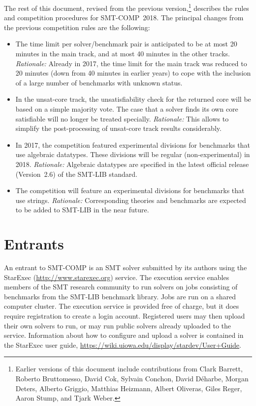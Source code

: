 \documentclass[12pt]{article}
\begin{document}
The rest of this document, revised from the previous
version,\footnote{Earlier versions of this document include
  contributions from Clark Barrett, Roberto Bruttomesso, David Cok,
  Sylvain Conchon, David D{\'e}harbe, Morgan Deters, Alberto Griggio,
  Matthias Heizmann, Albert Oliveras, Giles Reger, Aaron Stump, and
  Tjark Weber.}  describes the rules and competition procedures for
SMT-COMP~2018.  The principal changes from the previous competition
rules are the following:
\begin{itemize}
\item The time limit per solver/benchmark pair is anticipated to be at
  most 20 minutes in the main track, and at most 40 minutes in the
  other tracks.  \emph{Rationale:} Already in 2017, the time limit for
  the main track was reduced to 20 minutes (down from 40 minutes in
  earlier years) to cope with the inclusion of a large number of
  benchmarks with unknown status.

\item In the unsat-core track, the unsatisfiability check for the
  returned core will be based on a simple majority vote.  The case
  that a solver finds its own core satisfiable will no longer be
  treated specially.  \emph{Rationale:} This allows to simplify the
  post-processing of unsat-core track results considerably.

\item In 2017, the competition featured experimental divisions for
  benchmarks that use algebraic datatypes.  These divisions will be
  regular (non-experimental) in 2018. \emph{Rationale:} Algebraic
  datatypes are specified in the latest official release (Version~2.6)
  of the SMT-LIB standard.
  
\item The competition will feature an experimental divisions for
  benchmarks that use strings.  \emph{Rationale:} Corresponding
  theories and benchmarks are expected to be added to SMT-LIB in the
  near future.
\end{itemize}


\section{Entrants}
\label{sec:entrants}

%
An entrant to SMT-COMP is an SMT solver submitted by its authors using
the StarExec (\url{http://www.starexec.org}) service.  The execution
service enables members of the SMT research community to run solvers
on jobs consisting of benchmarks from the SMT-LIB benchmark library.
Jobs are run on a shared computer cluster.  The execution service is
provided free of charge, but it does require registration to create a
login account.  Registered users may then upload their own solvers to
run, or may run public solvers already uploaded to the service.
Information about how to configure and upload a solver is contained in
the StarExec user guide,
\url{https://wiki.uiowa.edu/display/stardev/User+Guide}.
\end{document}
